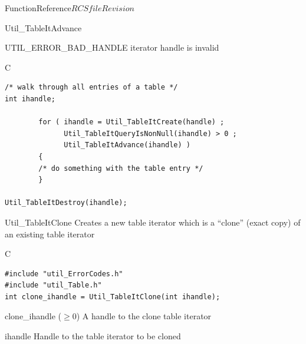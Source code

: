 \begin{cactuspart}{FunctionReference}{$RCSfile$}{$Revision$}
\begin{FunctionDescription}{Util\_TableItAdvance}
\begin{ErrorSection}
\begin{Error}{UTIL\_ERROR\_BAD\_HANDLE}
iterator handle is invalid
\end{Error}
\end{ErrorSection}

\begin{ExampleSection}
\begin{Example}{C}
\begin{verbatim}
/* walk through all entries of a table */
int ihandle;

        for ( ihandle = Util_TableItCreate(handle) ;
              Util_TableItQueryIsNonNull(ihandle) > 0 ;
              Util_TableItAdvance(ihandle) )
        {
        /* do something with the table entry */
        }

Util_TableItDestroy(ihandle);
\end{verbatim}
\end{Example}
\end{ExampleSection}
\end{FunctionDescription}


\begin{FunctionDescription}{Util\_TableItClone}
\label{Util-TableItClone}
Creates a new table iterator which is a ``clone'' (exact copy) of an
existing table iterator

\begin{SynopsisSection}
\begin{Synopsis}{C}
\begin{verbatim}
#include "util_ErrorCodes.h"
#include "util_Table.h"
int clone_ihandle = Util_TableItClone(int ihandle);
\end{verbatim}
\end{Synopsis}
\end{SynopsisSection}

\begin{ResultSection}
\begin{Result}{clone\_ihandle ($\ge 0$)}
A handle to the clone table iterator
\end{Result}
\end{ResultSection}

\begin{ParameterSection}
\begin{Parameter}{ihandle}
Handle to the table iterator to be cloned
\end{Parameter}
\end{ParameterSection}


\end{FunctionDescription}
\end{cactuspart}
